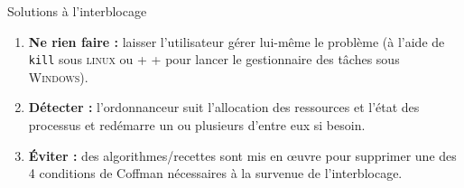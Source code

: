\documentclass[10pt]{beamer}
\begin{document}
\begin{frame}[fragile]{Solutions à l'interblocage}
\begin{enumerate}[--]
	\item 	\textbf{Ne rien faire :} laisser l'utilisateur gérer lui-même le problème (à l'aide de \texttt{kill} sous \textsc{linux} ou  + +  pour lancer le gestionnaire des tâches sous \textsc{Windows}).
	\item 	\textbf{Détecter :}  l’ordonnanceur suit l’allocation des ressources et l’état des processus et redémarre un ou plusieurs d’entre eux si besoin.
    \item \textbf{\'Eviter :} des algorithmes/recettes sont mis en œuvre pour supprimer une des 4 conditions de Coffman nécessaires à la survenue de l’interblocage.
\end{enumerate}
\end{frame}
\end{document}

